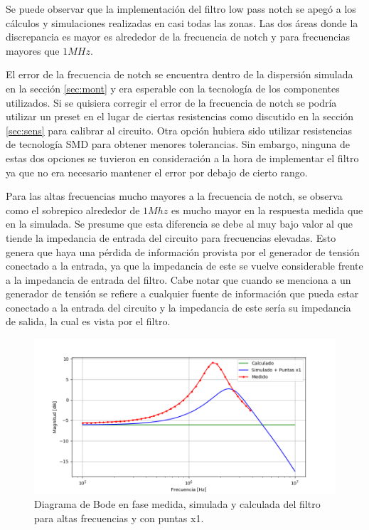 Se puede observar que la implementación del filtro low pass notch se apegó a los cálculos y simulaciones realizadas en casi todas las zonas. Las dos áreas donde la discrepancia es mayor es alrededor de la frecuencia de notch y para frecuencias mayores que $1MHz$. 

El error de la frecuencia de notch se encuentra dentro de la dispersión simulada en la sección \ref{sec:mont} y era esperable con la tecnología de los componentes utilizados. Si se quisiera corregir el error de la frecuencia de notch se podría utilizar un preset en el lugar de ciertas resistencias como discutido en la sección \ref{sec:sens} para calibrar al circuito. Otra opción hubiera sido utilizar resistencias de tecnología SMD para obtener menores tolerancias. Sin embargo, ninguna de estas dos opciones se tuvieron en consideración a la hora de implementar el filtro ya que no era necesario mantener el error por debajo de cierto rango. 

Para las altas frecuencias mucho mayores a la frecuencia de notch, se observa como el sobrepico alrededor de $1Mhz$ es mucho mayor en la respuesta medida que en la simulada. Se presume que esta diferencia se debe al muy bajo valor al que tiende la impedancia de entrada del circuito para frecuencias elevadas. Esto genera que haya una pérdida de información provista por el generador de tensión conectado a la entrada, ya que la impedancia de este se vuelve considerable frente a la impedancia de entrada del filtro. Cabe notar que cuando se menciona a un generador de tensión se refiere a cualquier fuente de información que pueda estar conectado a la entrada del circuito y la impedancia de este sería su impedancia de salida, la cual es vista por el filtro. 

\begin{figure}[H]
	\centering
	\includegraphics[width=\textwidth]{Imagenes/bode_calc_sim_med_highf.PNG}
	\caption{Diagrama de Bode en fase medida, simulada y calculada del filtro para altas frecuencias y con puntas x1.}
	\label{fig:bodefase_calc_sim_med_highf}
\end{figure}

